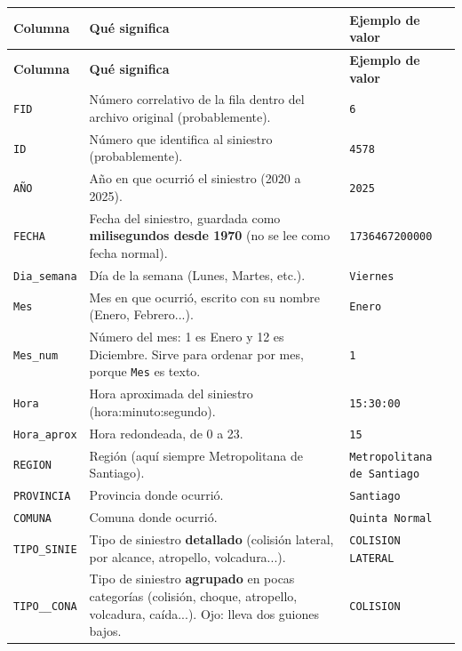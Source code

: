 \documentclass[10.5pt]{article}
\newcommand{\hdr}[1]{\textbf{\color{white}#1}}
\begin{document}
\begin{xltabular}{\linewidth}{@{}p{4.5cm} >{\raggedright\arraybackslash}X p{3.4cm}@{}}
\hdr{Columna} & \hdr{Qué significa} & \hdr{Ejemplo de valor} \\
\endfirsthead
{}\hdr{Columna} & \hdr{Qué significa} & \hdr{Ejemplo de valor} \\
\endhead
\texttt{FID} & Número correlativo de la fila dentro del archivo original (probablemente). & \texttt{6} \\
\texttt{ID} & Número que identifica al siniestro (probablemente). & \texttt{4578} \\
\texttt{AÑO} & Año en que ocurrió el siniestro (2020 a 2025). & \texttt{2025} \\
\texttt{FECHA} & Fecha del siniestro, guardada como \textbf{milisegundos desde 1970} (no se lee como fecha normal). & \texttt{1736467200000} \\
\texttt{Dia\_\allowbreak{}semana} & Día de la semana (Lunes, Martes, etc.). & \texttt{Viernes} \\
\texttt{Mes} & Mes en que ocurrió, escrito con su nombre (Enero, Febrero...). & \texttt{Enero} \\
\texttt{Mes\_\allowbreak{}num} & Número del mes: 1 es Enero y 12 es Diciembre. Sirve para ordenar por mes, porque \texttt{Mes} es texto. & \texttt{1} \\
\texttt{Hora} & Hora aproximada del siniestro (hora:minuto:segundo). & \texttt{15:30:00} \\
\texttt{Hora\_\allowbreak{}aprox} & Hora redondeada, de 0 a 23. & \texttt{15} \\
\texttt{REGION} & Región (aquí siempre Metropolitana de Santiago). & \texttt{Metropolitana de Santiago} \\
\texttt{PROVINCIA} & Provincia donde ocurrió. & \texttt{Santiago} \\
\texttt{COMUNA} & Comuna donde ocurrió. & \texttt{Quinta Normal} \\
\texttt{TIPO\_\allowbreak{}SINIE} & Tipo de siniestro \textbf{detallado} (colisión lateral, por alcance, atropello, volcadura...). & \texttt{COLISION LATERAL} \\
\texttt{TIPO\_\allowbreak{}\_\allowbreak{}CONA} & Tipo de siniestro \textbf{agrupado} en pocas categorías (colisión, choque, atropello, volcadura, caída...). Ojo: lleva dos guiones bajos. & \texttt{COLISION} \\

\end{xltabular}
\end{document}
